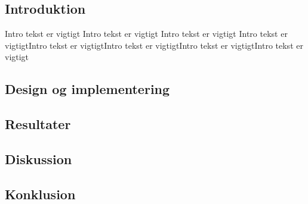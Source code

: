 \documentclass[../journal2.tex]{subfiles}
\begin{document}
\subsection{Introduktion}
Intro tekst er vigtigt Intro tekst er vigtigt Intro tekst er vigtigt Intro tekst er vigtigtIntro tekst er vigtigtIntro tekst er vigtigtIntro tekst er vigtigtIntro tekst er vigtigt
\subsection{Design og implementering}


\subsection{Resultater}

\subsection{Diskussion}

\subsection{Konklusion}
\end{document}
